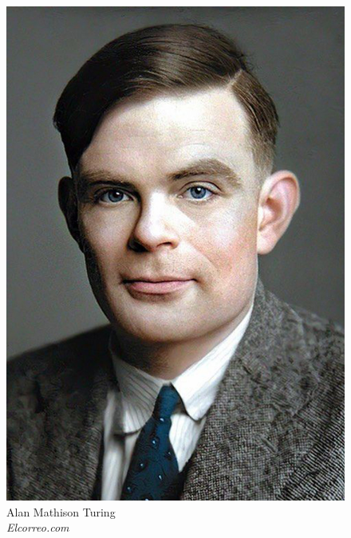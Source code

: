 \begin{frame}[t,fragile]
{\begin{minipage}[t]{\textwidth}
\begin{minipage}[t]{0.6\textwidth}
\begin{itemize}[leftmargin=10pt,align=right]
\begin{itemize}[leftmargin=10pt,align=right]
						\end{itemize}
					\end{itemize}
            	\end{minipage}
            	\begin{minipage}[t]{0.4\textwidth}
                	\centering
                	\begin{figure}[ht]
						\includegraphics[width=.6\textwidth]{img/alan-turing-color.png}
						{\tiny\\Alan Mathison Turing\\\vspace*{-1pt}\textit{\textcopyright Elcorreo.com}}
                	\end{figure}
            	\end{minipage}
	    	\end{minipage}
	}
\end{frame}
%
